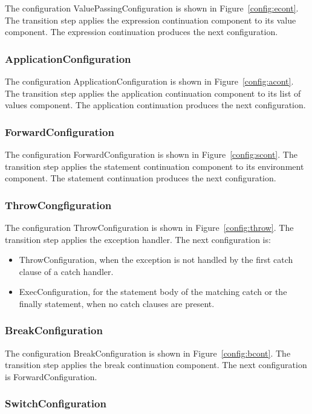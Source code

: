 \documentclass{article}
\begin{document}
The configuration ValuePassingConfiguration is shown in Figure~\ref{config:econt}.
The transition step applies the expression continuation component to its value component.
The expression continuation produces the next configuration.

\subsubsection{ApplicationConfiguration}
\label{subsubsec:applicationconfig}

The configuration ApplicationConfiguration is shown in Figure~\ref{config:acont}.
The transition step applies the application continuation component to its list of values component.
The application continuation produces the next configuration.
\subsubsection{ForwardConfiguration}
\label{subsubsec:forwardconfig}

The configuration ForwardConfiguration is shown in Figure~\ref{config:scont}.
The transition step applies the statement continuation component to its environment component.
The statement continuation produces the next configuration.

\subsubsection{ThrowCongfiguration}
\label{subsubsec:throwconfig}
The configuration ThrowConfiguration is shown in Figure~\ref{config:throw}.
The transition step applies the exception handler.
The next configuration is:
\begin{itemize}
\item ThrowConfiguration, when the exception is not handled by the first catch clause of a catch handler.
\item ExecConfiguration, for the statement body of the matching catch or the finally statement, when no catch clauses are present.
\end{itemize}
\subsubsection{BreakConfiguration}
\label{subsubsec:breakconfig}
The configuration BreakConfiguration is shown in Figure~\ref{config:bcont}.
The transition step applies the break continuation component.
The next configuration is ForwardConfiguration.
\subsubsection{SwitchConfiguration}
\label{subsubsec:switchconfig}
\end{document}
